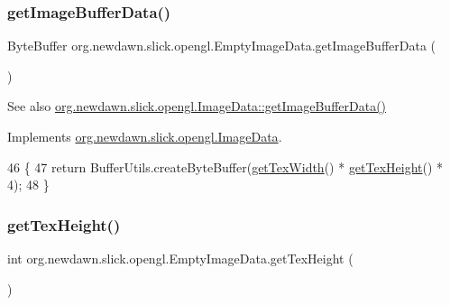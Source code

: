 \subsubsection{\texorpdfstring{get\+Image\+Buffer\+Data()}{getImageBufferData()}}
{\footnotesize\ttfamily Byte\+Buffer org.\+newdawn.\+slick.\+opengl.\+Empty\+Image\+Data.\+get\+Image\+Buffer\+Data (\begin{DoxyParamCaption}{ }\end{DoxyParamCaption})\hspace{0.3cm}{\ttfamily [inline]}}

\begin{DoxySeeAlso}{See also}
\mbox{\hyperlink{interfaceorg_1_1newdawn_1_1slick_1_1opengl_1_1_image_data_a7b15d49f552cad075bb1179668ce5250}{org.\+newdawn.\+slick.\+opengl.\+Image\+Data\+::get\+Image\+Buffer\+Data()}} 
\end{DoxySeeAlso}


Implements \mbox{\hyperlink{interfaceorg_1_1newdawn_1_1slick_1_1opengl_1_1_image_data_a7b15d49f552cad075bb1179668ce5250}{org.\+newdawn.\+slick.\+opengl.\+Image\+Data}}.


\begin{DoxyCode}
46                                            \{
47         \textcolor{keywordflow}{return} BufferUtils.createByteBuffer(\mbox{\hyperlink{classorg_1_1newdawn_1_1slick_1_1opengl_1_1_empty_image_data_ad261b00a724191075cff314442c14baa}{getTexWidth}}() * 
      \mbox{\hyperlink{classorg_1_1newdawn_1_1slick_1_1opengl_1_1_empty_image_data_a2b9c2b476faf9f62c172cd8b20350101}{getTexHeight}}() * 4);
48     \}
\end{DoxyCode}
\mbox{\label{classorg_1_1newdawn_1_1slick_1_1opengl_1_1_empty_image_data_a2b9c2b476faf9f62c172cd8b20350101}} 
\subsubsection{\texorpdfstring{get\+Tex\+Height()}{getTexHeight()}}
{\footnotesize\ttfamily int org.\+newdawn.\+slick.\+opengl.\+Empty\+Image\+Data.\+get\+Tex\+Height (\begin{DoxyParamCaption}{ }\end{DoxyParamCaption})\hspace{0.3cm}{\ttfamily [inline]}}

